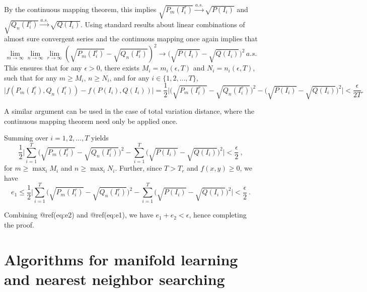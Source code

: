\documentclass{article}
\begin{document}
By the continuous mapping theorem, this implies
\(\sqrt{P_m(I_i^r)}\overset{a.s.}{\rightarrow}\sqrt{P(I_i)}\) and
\(\sqrt{Q_n(I_i^r)}\overset{a.s.}{\rightarrow}\sqrt{Q(I_i)}\). Using
standard results about linear combinations of almost sure convergent
series and the continuous mapping once again implies that
\begin{equation}
\lim_{m \rightarrow \infty}\lim_{n \rightarrow \infty}\lim_{r \rightarrow \infty}\left(\sqrt{P_m(I_i^r)} - \sqrt{Q_n(I_i^r)} \right)^2\rightarrow\bigg( \sqrt{P(I_i)} - \sqrt{Q(I_i)} \bigg)^2\, a.s.
\end{equation} This ensures that for any \(\epsilon > 0\), there exists
\(M_i = m_i(\epsilon, T)\) and \(N_i = n_i(\epsilon, T)\), such that for
any \(m \geq M_i\), \(n \geq N_i\), and for any
\(i \in \{1,2,\dots,T\}\), \begin{equation}
\label{eq:e1function}
\bigg| f(P_m(I_i^r), Q_n(I_i^r)) - f(P(I_i), Q(I_i)) \bigg| 
= \frac{1}{2} \bigg| \bigg( \sqrt{P_m(I_i^r)} - \sqrt{Q_n(I_i^r)} \bigg)^2 - \bigg( \sqrt{P(I_i)} - \sqrt{Q(I_i)} \bigg)^2 \bigg| 
< \frac{\epsilon}{2T} .
\end{equation}

A similar argument can be used in the case of total variation distance,
where the continuous mapping theorem need only be applied once.

Summing over \(i=1,2,\dots, T\) yields \begin{equation}
\frac{1}{2} \bigg| \sum_{i=1}^{T} \bigg( \sqrt{P_m(I_i^r)} - \sqrt{Q_n(I_i^r)} \bigg)^2 -
\sum_{i=1}^{T} \bigg( \sqrt{P(I_i)} - \sqrt{Q(I_i)} \bigg)^2 \bigg| < \frac{\epsilon}{2} \ ,
\end{equation} for \(m \geq \max_i{M_i}\) and \(n \geq \max_i{N_i}\).
Further, since \(T > T_r\) and \(f(x,y) \geq 0\), we have
\begin{equation}\label{eq:e1}
e_1 \leq \frac{1}{2} \bigg| \sum_{i=1}^{T} \bigg( \sqrt{P_m(I_i^r)} - \sqrt{Q_n(I_i^r)} \bigg)^2 -
\sum_{i=1}^{T} \bigg( \sqrt{P(I_i)} - \sqrt{Q(I_i)} \bigg)^2 \bigg| < \frac{\epsilon}{2} \ .
\end{equation}

Combining @ref(eq:e2) and @ref(eq:e1), we have \(e_1 + e_2 < \epsilon\),
hence completing the proof.

\hypertarget{mlann}{%
\section{Algorithms for manifold learning and nearest neighbor
searching}\label{mlann}}
\end{document}
